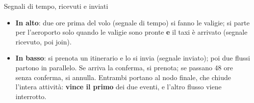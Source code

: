 \begin{esempio}{Segnali di tempo, ricevuti e inviati}
\begin{center}
\end{center}
\begin{itemize}
  \item \textbf{In alto}: due ore prima del volo (segnale di tempo) si fanno le valigie; si parte per l'aeroporto solo quando le
        valigie sono pronte \textbf{e} il taxi è arrivato (segnale ricevuto, poi join).
  \item \textbf{In basso}: si prenota un itinerario e lo si invia (segnale inviato); poi due flussi partono in parallelo. Se arriva
        la conferma, si prenota; se passano 48 ore senza conferma, si annulla. Entrambi portano al nodo finale, che chiude
        l'intera attività: \textbf{vince il primo} dei due eventi, e l'altro flusso viene interrotto.
\end{itemize}
\end{esempio}


